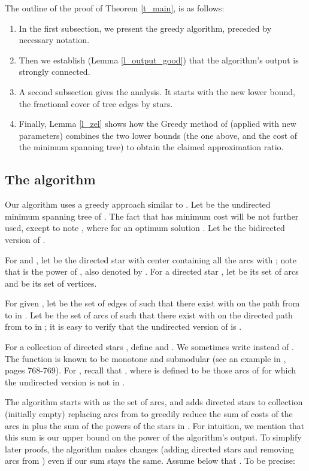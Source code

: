\documentclass[12pt]{article}
\begin{document}
The outline of the proof 
of Theorem \ref{t_main}, is as follows:
\begin{enumerate}
\item In the first subsection,
we present the greedy algorithm, preceded by necessary notation.

\item Then we establish (Lemma \ref{l_output_good}) that the algorithm's
output is strongly connected.

\item A second subsection gives the analysis.
It starts with the new lower bound, the fractional cover of tree
edges by stars.

\item Finally, Lemma \ref{l_zel} shows how the Greedy method of
\cite{RZ00} (applied with new parameters) combines the two lower bounds
(the one above, and the cost of the minimum spanning tree) 
to obtain the claimed approximation ratio.
\end{enumerate}

\subsection{The algorithm}

Our algorithm uses a greedy approach similar to \cite{Z96,RZ00,CFM07}.
Let  be the undirected minimum spanning tree of . 
The fact that  has minimum cost will be not further used,
except to note ,
where  for an optimum solution .
Let  be the bidirected version of .

For  and ,
let  be the directed star with center  containing
all the arcs  with ; note that  is the power of ,
also denoted by .
For a directed star , let  be its set of arcs and
 be its set of vertices. 


For given , let  be the set of edges  of 
such that there exist 
with  on the path from  to  in .
Let  be the set of arcs  of   
such that there exist 
with  on the directed path from  to  in ;
it is easy to verify
that the undirected version of  is .

For a collection  of directed stars , 
define  and
. We sometimes write  instead of
.
The function  is known to be monotone and submodular  
(see an example in \cite{Schrijver03}, pages 768-769).
For , recall that ,
where  is defined to be those arcs of  
for which the undirected version is not in .

The algorithm starts with  as the set of arcs, and 
adds directed stars to collection  (initially empty)
replacing arcs from  to greedily reduce the sum of costs  
of the arcs in  plus the sum of the powers of the stars in .
For intuition, we mention
that this sum is our upper bound on the power of the algorithm's output.
To simplify later proofs, the algorithm makes changes 
(adding directed stars and removing arcs from )
even if our sum stays the same. Assume below that . To be precise:
\end{document}
